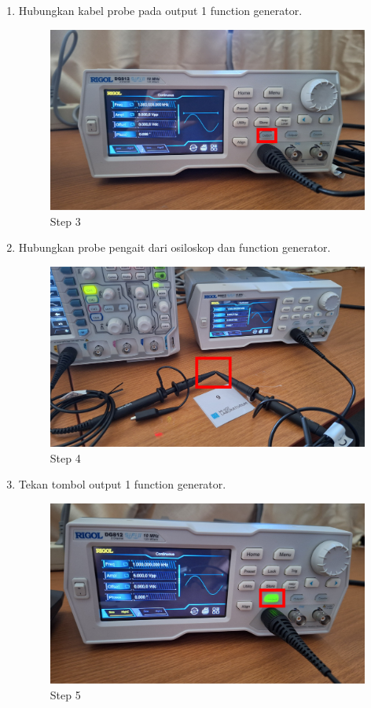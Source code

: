 \begin{center}
\begin{enumerate}
		\item Hubungkan kabel probe pada output 1 function generator.
		      \begin{figure}[H]
			      \centering
			      \includegraphics[width=0.8\linewidth]{P1/img/per 2/step 3.png}
			      \caption{Step 3}
			      \label{fig:Step 3(Group 9)}
		      \end{figure}

		\item Hubungkan probe pengait dari osiloskop dan function generator.
		      \begin{figure}[H]
			      \centering
			      \includegraphics[width=0.8\linewidth]{P1/img/per 2/step 4.png}
			      \caption{Step 4}
			      \label{fig:Step 4(Group 10)}
		      \end{figure}

		\item Tekan tombol output 1 function generator.
		      \begin{figure}[H]
			      \centering
			      \includegraphics[width=0.8\linewidth]{P1/img/per 2/step 5.png}
			      \caption{Step 5}
			      \label{fig:Step 5(Group 11)}
		      \end{figure}


\end{enumerate}
\end{center}
